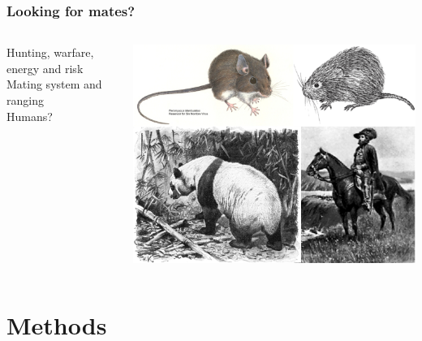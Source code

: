 \documentclass{beamer}
\begin{document}
\begin{frame}
\frametitle{Looking for mates? }

\begin{columns}
\begin{column}{.5\textwidth}

Hunting, warfare, energy and risk \\
\vspace{0.75cm}
Mating system and ranging \\
\vspace{0.75cm}
Humans? \\

\end{column}

\begin{column}{.5\textwidth}
\includegraphics[width= 1\textwidth]{dimorph}
\end{column}

\end{columns}

\end{frame}


\section{Methods}

\end{document}
